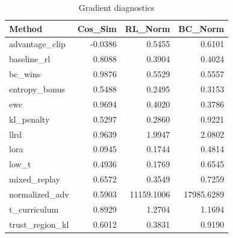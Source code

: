 \begin{table}[htbp]
\centering
\caption{Gradient diagnostics}
\label{tab:grad-diag}
\begin{tabular}{lrrr}
\toprule
\textbf{Method} & \textbf{Cos\_Sim} & \textbf{RL\_Norm} & \textbf{BC\_Norm} \\
\midrule
advantage\_clip & -0.0386 & 0.5455 & 0.6101 \\
baseline\_rl & 0.8088 & 0.3904 & 0.4024 \\
bc\_wins & 0.9876 & 0.5529 & 0.5557 \\
entropy\_bonus & 0.5488 & 0.2495 & 0.3153 \\
ewc & 0.9694 & 0.4020 & 0.3786 \\
kl\_penalty & 0.5297 & 0.2860 & 0.9221 \\
llrd & 0.9639 & 1.9947 & 2.0802 \\
lora & 0.0945 & 0.1744 & 0.4814 \\
low\_t & 0.4936 & 0.1769 & 0.6545 \\
mixed\_replay & 0.6572 & 0.3549 & 0.7259 \\
normalized\_adv & 0.5903 & 11159.1006 & 17985.6289 \\
t\_curriculum & 0.8929 & 1.2704 & 1.1694 \\
trust\_region\_kl & 0.6012 & 0.3831 & 0.9190 \\
\bottomrule
\end{tabular}
\end{table}